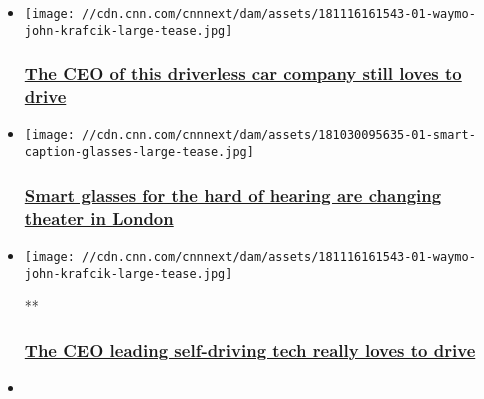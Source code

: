 \begin{itemize}
\item
  \href{/2018/11/21/success/waymo-ceo-driverless-cars/index.html}{}

  \texttt{[image: //cdn.cnn.com/cnnnext/dam/assets/181116161543-01-waymo-john-krafcik-large-tease.jpg]}

  \hypertarget{the-ceo-of-this-driverless-car-company-still-loves-to-drive-}{%
  \subsubsection{\texorpdfstring{\href{/2018/11/21/success/waymo-ceo-driverless-cars/index.html}{The
  CEO of this driverless car company still loves to drive
  }}{The CEO of this driverless car company still loves to drive }}\label{the-ceo-of-this-driverless-car-company-still-loves-to-drive-}}
\item
  \href{/2018/10/30/tech/smart-caption-glasses/index.html}{}

  \texttt{[image: //cdn.cnn.com/cnnnext/dam/assets/181030095635-01-smart-caption-glasses-large-tease.jpg]}

  \hypertarget{smart-glasses-for-the-hard-of-hearing-are-changing-theater-in-london}{%
  \subsubsection{\texorpdfstring{\href{/2018/10/30/tech/smart-caption-glasses/index.html}{Smart
  glasses for the hard of hearing are changing theater in
  London}}{Smart glasses for the hard of hearing are changing theater in London}}\label{smart-glasses-for-the-hard-of-hearing-are-changing-theater-in-london}}
\item
  \href{/videos/business/2018/11/16/waymo-ceo-google-self-driving-car-zw-orig.cnn-business}{}

  \texttt{[image: //cdn.cnn.com/cnnnext/dam/assets/181116161543-01-waymo-john-krafcik-large-tease.jpg]}

  **

  \hypertarget{the-ceo-leading-self-driving-tech-really-loves-to-drive}{%
  \subsubsection{\texorpdfstring{\href{/videos/business/2018/11/16/waymo-ceo-google-self-driving-car-zw-orig.cnn-business}{The
  CEO leading self-driving tech really loves to
  drive}}{The CEO leading self-driving tech really loves to drive}}\label{the-ceo-leading-self-driving-tech-really-loves-to-drive}}
\item
  \href{/2018/11/12/tech/aaptiv-app/index.html}{}


\end{itemize}
